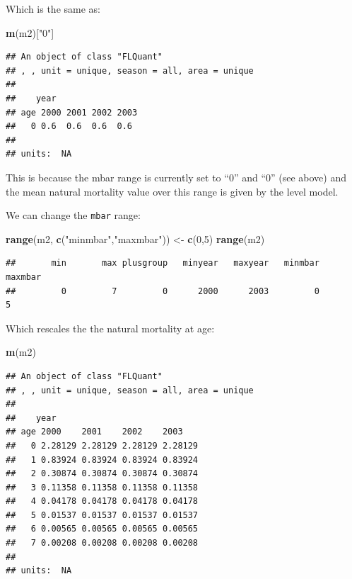 \documentclass[
]{book}
\newenvironment{Shaded}{\begin{snugshade}}{\end{snugshade}}
\newcommand{\DecValTok}[1]{\textcolor[rgb]{0.00,0.00,0.81}{#1}}
\newcommand{\FunctionTok}[1]{\textcolor[rgb]{0.13,0.29,0.53}{\textbf{#1}}}
\newcommand{\NormalTok}[1]{#1}
\newcommand{\OtherTok}[1]{\textcolor[rgb]{0.56,0.35,0.01}{#1}}
\newcommand{\StringTok}[1]{\textcolor[rgb]{0.31,0.60,0.02}{#1}}
\begin{document}
Which is the same as:

\begin{Shaded}
\begin{Highlighting}[]
\FunctionTok{m}\NormalTok{(m2)[}\StringTok{"0"}\NormalTok{]}
\end{Highlighting}
\end{Shaded}

\begin{verbatim}
## An object of class "FLQuant"
## , , unit = unique, season = all, area = unique
## 
##    year
## age 2000 2001 2002 2003
##   0 0.6  0.6  0.6  0.6 
## 
## units:  NA
\end{verbatim}

This is because the mbar range is currently set to ``0'' and ``0'' (see above) and the mean natural mortality value over this range is given by the level model.

We can change the \texttt{mbar} range:

\begin{Shaded}
\begin{Highlighting}[]
\FunctionTok{range}\NormalTok{(m2, }\FunctionTok{c}\NormalTok{(}\StringTok{"minmbar"}\NormalTok{,}\StringTok{"maxmbar"}\NormalTok{)) }\OtherTok{\textless{}{-}} \FunctionTok{c}\NormalTok{(}\DecValTok{0}\NormalTok{,}\DecValTok{5}\NormalTok{)}
\FunctionTok{range}\NormalTok{(m2)}
\end{Highlighting}
\end{Shaded}

\begin{verbatim}
##       min       max plusgroup   minyear   maxyear   minmbar   maxmbar 
##         0         7         0      2000      2003         0         5
\end{verbatim}

Which rescales the the natural mortality at age:

\begin{Shaded}
\begin{Highlighting}[]
\FunctionTok{m}\NormalTok{(m2)}
\end{Highlighting}
\end{Shaded}

\begin{verbatim}
## An object of class "FLQuant"
## , , unit = unique, season = all, area = unique
## 
##    year
## age 2000    2001    2002    2003   
##   0 2.28129 2.28129 2.28129 2.28129
##   1 0.83924 0.83924 0.83924 0.83924
##   2 0.30874 0.30874 0.30874 0.30874
##   3 0.11358 0.11358 0.11358 0.11358
##   4 0.04178 0.04178 0.04178 0.04178
##   5 0.01537 0.01537 0.01537 0.01537
##   6 0.00565 0.00565 0.00565 0.00565
##   7 0.00208 0.00208 0.00208 0.00208
## 
## units:  NA
\end{verbatim}
\end{document}
